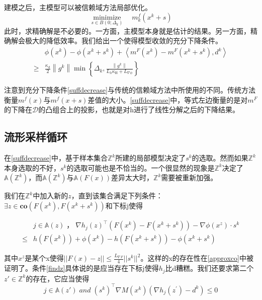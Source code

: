 \documentclass[macfonts]{njuthesis}
\begin{document}
建模之后，主模型可以被信赖域方法局部优化。
\begin{equation}
\label{minimize}
\underset{s \in B\left(0 ; \Delta_{k}\right)}{\operatorname{minimize}} \quad m_{k}^{f}\left(x^{k}+s\right)
\end{equation}
此时，求精确解是不必要的。一方面，主模型本身就是估计的结果。另一方面，精确解会极大的降低效率。我们给出一个使得模型收敛的充分下降条件。
\begin{equation}
\label{suffdecrease}
\begin{aligned}
&\phi(x^k)-\phi(x^k+s^k)+\left\langle m^F\left(x^{k}\right)-m^F\left(x^{k}+s^{k}\right), d^{k}\right\rangle \\
\geq &\frac{\kappa_{\mathrm{d}}}{2}\left\|g^{k}\right\| \min \left\{\Delta_{k}, \frac{\left\|g^{k}\right\|}{L_{h} \kappa_{\mathrm{H}}+L_{\nabla \phi}}\right\}
\end{aligned}
\end{equation}

注意到充分下降条件\ref{suffdecrease}与传统的信赖域方法中所使用的不同。传统方法衡量$m^f(x)$与$m^f(x+s)$差值的大小。\ref{suffdecrease}中，等式左边衡量的是对$m^F$的下降在$\mathcal{D}$的凸组合上的投影，也就是对h进行了线性分解之后的下降结果。

\subsection{流形采样循环}

在\ref{suffdecrease}中，基于样本集合$\mathbb{Z}^k$所建的局部模型决定了$s^k$的选取。然而如果$\mathbb{Z}^k$本身选取的不好，$s^k$的选取可能也是不恰当的。一个很显然的现象是$\mathbb{Z}^k$决定了$\mathbb{A}(\mathbb{Z}^k)$，而$\mathbb{A}(\mathbb{Z}^k)$与$\mathbb{A}(F(x))$差异太大时，$\mathbb{Z}^k$需要被重新加强。

我们在$\mathbb{Z}^k$中加入新的$z$，直到该集合满足下列条件：$
\exists z \in \mathbf{co}(F(x^k),F(x^k+s^k))$和下标j使得


\begin{equation}
\label{findz}
\begin{aligned}
&j\in \mathbb{A}(z)\; \text{，}\;\nabla h_{j}(z)^{\top}\left(F(x^{k})-F(x^{k}+s^{k})\right) -\nabla \phi(x^z)\cdot s^k\\ \leq &h(F(x^{k}))+\phi(x^k)-h(F(x^{k}+s^{k}))-\phi(x^k+s^k)
\end{aligned}
\end{equation}

其中$x^z$是某个x使得$||F(x)-z||\leq\frac{L_{\nabla F}}{4}||s^k||^2$。这样的x的存在性在\ref{approxco}中被证明了。条件\ref{findz}具体说的是应当存在下标j使得$h_j$比d糟糕。我们还要求第二个$z'\in \mathbb{Z}^k$的存在，它应当使得
\begin{equation}
\label{zprime}
j\in\mathbb{A}(z')\;and\;
\left(s^{k}\right)^{\top} \nabla M\left(x^{k}\right)\left(\nabla h_{j}\left(z^{\prime}\right)-d^{k}\right) \leq 0
\end{equation}
\end{document}
